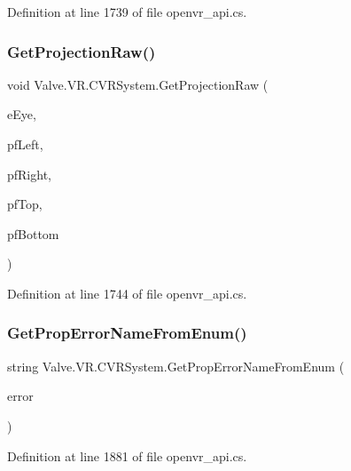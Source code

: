 Definition at line 1739 of file openvr\+\_\+api.\+cs.

\mbox{\label{class_valve_1_1_v_r_1_1_c_v_r_system_a6154e9257dca79f7c208c3e737160d4f}} 
\subsubsection{\texorpdfstring{GetProjectionRaw()}{GetProjectionRaw()}}
{\footnotesize\ttfamily void Valve.\+V\+R.\+C\+V\+R\+System.\+Get\+Projection\+Raw (\begin{DoxyParamCaption}\item[{\mbox{\hyperlink{namespace_valve_1_1_v_r_a8153d4a3e627e1cede046327087c1880}{E\+V\+R\+Eye}}}]{e\+Eye,  }\item[{ref float}]{pf\+Left,  }\item[{ref float}]{pf\+Right,  }\item[{ref float}]{pf\+Top,  }\item[{ref float}]{pf\+Bottom }\end{DoxyParamCaption})}



Definition at line 1744 of file openvr\+\_\+api.\+cs.

\mbox{\label{class_valve_1_1_v_r_1_1_c_v_r_system_a416e8b65c6d1c54c84196346a17c9e90}} 
\subsubsection{\texorpdfstring{GetPropErrorNameFromEnum()}{GetPropErrorNameFromEnum()}}
{\footnotesize\ttfamily string Valve.\+V\+R.\+C\+V\+R\+System.\+Get\+Prop\+Error\+Name\+From\+Enum (\begin{DoxyParamCaption}\item[{\mbox{\hyperlink{namespace_valve_1_1_v_r_aab6684f03930a2d2cf22ed66b437e47b}{E\+Tracked\+Property\+Error}}}]{error }\end{DoxyParamCaption})}



Definition at line 1881 of file openvr\+\_\+api.\+cs.

